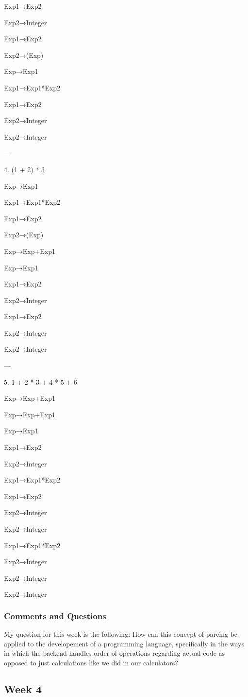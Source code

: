 \documentclass{article}
\theoremstyle{theorem}
\theoremstyle{definition}
\theoremstyle{remark}
\begin{document}
Exp1→Exp2

Exp2→Integer

Exp1→Exp2

Exp2→(Exp)

Exp→Exp1

Exp1→Exp1*Exp2

Exp1→Exp2

Exp2→Integer

Exp2→Integer

---

4. (1 + 2) * 3

Exp→Exp1

Exp1→Exp1*Exp2

Exp1→Exp2

Exp2→(Exp)

Exp→Exp+Exp1

Exp→Exp1

Exp1→Exp2

Exp2→Integer

Exp1→Exp2

Exp2→Integer

Exp2→Integer

---

5. 1 + 2 * 3 + 4 * 5 + 6

Exp→Exp+Exp1

Exp→Exp+Exp1

Exp→Exp1

Exp1→Exp2

Exp2→Integer

Exp1→Exp1*Exp2

Exp1→Exp2

Exp2→Integer

Exp2→Integer

Exp1→Exp1*Exp2

Exp2→Integer

Exp2→Integer

Exp2→Integer


\subsubsection*{Comments and Questions}

My question for this week is the following: How can this concept of parcing be applied to the developement of a programming language, specifically in the ways in which the backend handles order of operations regarding actual code as opposed to just calculations like we did in our calculators?

\subsection{Week 4}
\end{document}
